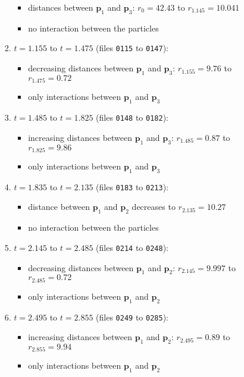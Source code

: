 \documentclass[a4paper]{article}
\newcommand{\boldp}{\boldsymbol{p}}
\begin{document}
\begin{enumerate}
\begin{enumerate}
\begin{enumerate}
\begin{itemize}
\item distances between \(\boldp_1\) and \(\boldp_3\): \(r_0=42.43\) to \(r_{1.145}=10.041\)
\item no interaction between the particles
\end{itemize}
\item \(t=1.155\) to \(t=1.475\) (files \texttt{0115} to \texttt{0147}):
\begin{itemize}
\item decreasing distances between \(\boldp_1\) and \(\boldp_3\): \(r_{1.155}=9.76\) to \(r_{1.475}=0.72\)
\item only interactions between \(\boldp_1\) and \(\boldp_3\)
\end{itemize}
\item \(t=1.485\) to \(t=1.825\) (files \texttt{0148} to \texttt{0182}):
\begin{itemize}
\item increasing distances between \(\boldp_1\) and \(\boldp_3\): \(r_{1.485}=0.87\) to \(r_{1.825}=9.86\)
\item only interactions between \(\boldp_1\) and \(\boldp_3\)
\end{itemize}
\item \(t=1.835\) to \(t=2.135\) (files \texttt{0183} to \texttt{0213}):
\begin{itemize}
\item distance between \(\boldp_1\) and \(\boldp_2\) decreases to \(r_{2.135}=10.27\)
\item no interaction between the particles
\end{itemize}
\item \(t=2.145\) to \(t=2.485\) (files \texttt{0214} to \texttt{0248}):
\begin{itemize}
\item decreasing distances between \(\boldp_1\) and \(\boldp_2\): \(r_{2.145}=9.997\) to \(r_{2.485}=0.72\)
\item only interactions between \(\boldp_1\) and \(\boldp_2\)
\end{itemize}
\item \(t=2.495\) to \(t=2.855\) (files \texttt{0249} to \texttt{0285}):
\begin{itemize}
\item increasing distances between \(\boldp_1\) and \(\boldp_2\): \(r_{2.495}=0.89\) to \(r_{2.855}=9.94\)
\item only interactions between \(\boldp_1\) and \(\boldp_2\)
\end{itemize}

\end{enumerate}
\end{enumerate}
\end{enumerate}
\end{document}
